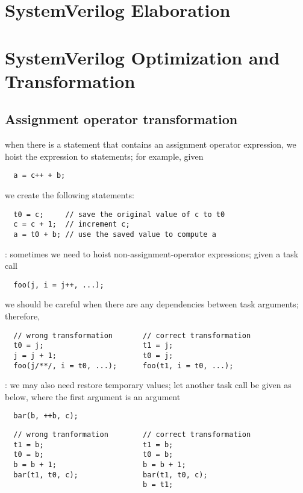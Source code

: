 \documentclass{note}
\begin{document}
\small


\tableofcontents

\section{SystemVerilog Elaboration}


\section{SystemVerilog Optimization and Transformation}
\subsection{Assignment operator transformation}
\bit
\w  when there is a statement that contains an assignment operator expression,
we hoist the expression to statements; for example, given
  \begin{verbatim}
  a = c++ + b;
  \end{verbatim}
we create the following statements:
  \begin{verbatim}
  t0 = c;     // save the original value of c to t0
  c = c + 1;  // increment c;
  a = t0 + b; // use the saved value to compute a
  \end{verbatim}
\w {}: sometimes we need to hoist
non-assignment-operator expressions; given a task call
  \begin{verbatim}
  foo(j, i = j++, ...);
  \end{verbatim}
we should be careful when there are any dependencies between task arguments;
therefore, 
  \begin{verbatim}
  // wrong transformation       // correct transformation
  t0 = j;                       t1 = j;
  j = j + 1;                    t0 = j;
  foo(j/**/, i = t0, ...);      foo(t1, i = t0, ...);
  \end{verbatim}

  \w {}: we may also need restore
  temporary values; let another task call be given as below, where the first
  argument is an  argument
  \begin{verbatim}
  bar(b, ++b, c);
  \end{verbatim}
  \begin{verbatim}
  // wrong tranformation        // correct transformation
  t1 = b;                       t1 = b;
  t0 = b;                       t0 = b;
  b = b + 1;                    b = b + 1;
  bar(t1, t0, c);               bar(t1, t0, c);
                                b = t1;
  \end{verbatim}
\eit 
\end{document}
